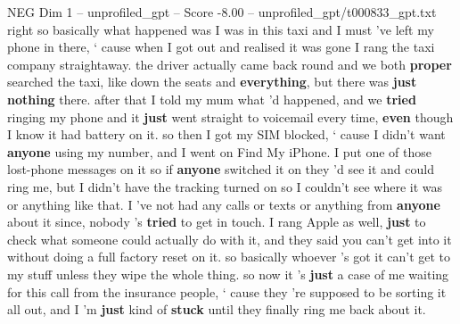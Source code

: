 \begin{textsample}{NEG Dim 1 – unprofiled\_gpt – Score -8.00 – unprofiled\_gpt/t000833\_gpt.txt}  \label{ex:f1_neg_025}
right so basically what happened was I was in this taxi and I must ’ve left my phone in there, ‘ cause when I got out and realised it was gone I rang the taxi company straightaway. the driver actually came back round and we both \textbf{proper} searched the taxi, like down the seats and \textbf{everything}, but there was \textbf{just} \textbf{nothing} there. after that I told my mum what ’d happened, and we \textbf{tried} ringing my phone and it \textbf{just} went straight to voicemail every time, \textbf{even} though I know it had battery on it. so then I got my SIM blocked, ‘ cause I didn't want \textbf{anyone} using my number, and I went on Find My iPhone.
I put one of those lost-phone messages on it so if \textbf{anyone} switched it on they ’d see it and could ring me, but I didn't have the tracking turned on so I couldn't see where it was or anything like that.
I ’ve not had any calls or texts or anything from \textbf{anyone} about it since, nobody ’s \textbf{tried} to get in touch.
I rang Apple as well, \textbf{just} to check what someone could actually do with it, and they said you can't get into it without doing a full factory reset on it. so basically whoever ’s got it can't get to my stuff unless they wipe the whole thing. so now it ’s \textbf{just} a case of me waiting for this call from the insurance people, ‘ cause they ’re supposed to be sorting it all out, and I ’m \textbf{just} kind of \textbf{stuck} until they finally ring me back about it.

\end{textsample}
